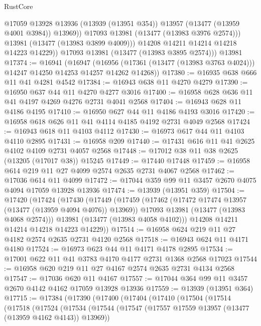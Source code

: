 \begin{lexlean}{RustCore}
\begin{coremodule}
                  @17059
                  @13928
                  @13936
                  (@13939 (@13951 @354))
                  @13957
                  (@13477 (@13959 @4001 @3984))
                  @13969))
              @17093
              @13981
              (@13477 (@13983 @3976 @2574)))
            @13981
            (@13477 (@13983 @3899 @4009)))
          @14208
          @14211
          @14214
          @14218
          @14223
          @14229))
      @17093
      @13981
      (@13477 (@13983 @3895 @2574)))
    @13981
@17374 := @16941
    (@16947
      (@16956 (@17361 (@13477 (@13983 @3763 @4024))) @14247 @14250 @14253 @14257 @14262 @14268))
@17380 := @16935 @638 @666 @11 @41 @4281 @4542
@17384 := @16943 @638 @11 @4270 @4279
@17390 := @16950 @637 @44 @11 @4270 @4277 @3016
@17400 := @16958 @628 @636 @11 @41 @4197 @4269 @4276 @2731 @4041 @2568
@17404 := @16943 @628 @11 @4186 @4195
@17410 := @16950 @627 @44 @11 @4186 @4193 @3016
@17420 := @16958 @618 @626 @11 @41 @4114 @4185 @4192 @2731 @4049 @2568
@17424 := @16943 @618 @11 @4103 @4112
@17430 := @16973 @617 @44 @11 @4103 @4110 @2895
@17431 := @16958 @209
@17440 := @17431 @616 @11 @41 @2625 @4102 @4109 @2731 @4057 @2568
@17448 := @17012 @38 @11 @38 @2625 (@13205 (@17017 @38)) @15245
@17449 := @17440 @17448
@17459 := @16958 @614 @219 @11 @27 @4099 @2574 @2635 @2731 @4067 @2568
@17462 := @17036 @614 @11 @4099
@17472 := @17044 @359 @99 @11 @3457 @2670 @4075 @4094 @17059 @13928 @13936
@17474 := @13939 (@13951 @359)
@17504 := @17420
    (@17424
      (@17430
        (@17449
          (@17459
            (@17462 (@17472 @17474 @13957 (@13477 (@13959 @4094 @4076)) @13969))
            @17093
            @13981
            (@13477 (@13983 @4068 @2574)))
          @13981
          (@13477 (@13983 @4058 @4102)))
        @14208
        @14211
        @14214
        @14218
        @14223
        @14229))
@17514 := @16958 @624 @219 @11 @27 @4182 @2574 @2635 @2731 @4120 @2568
@17518 := @16943 @624 @11 @4171 @4180
@17524 := @16973 @623 @44 @11 @4171 @4178 @2895
@17534 := @17001 @622 @11 @41 @3783 @4170 @4177 @2731 @1368 @2568 @17023
@17544 := @16958 @620 @219 @11 @27 @4167 @2574 @2635 @2731 @4134 @2568
@17547 := @17036 @620 @11 @4167
@17557 := @17044 @364 @99 @11 @3457 @2670 @4142 @4162 @17059 @13928 @13936
@17559 := @13939 (@13951 @364)
@17715 := @17384
    (@17390
      (@17400
        (@17404
          (@17410
            (@17504
              (@17514
                (@17518
                  (@17524
                    (@17534
                      (@17544
                        (@17547 (@17557 @17559 @13957 (@13477 (@13959 @4162 @4143)) @13969))

\end{coremodule}
\end{lexlean}
